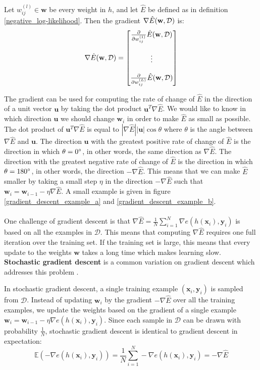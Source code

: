 \begin{definition}[gradient]
	\label{gradient}
	Let $w^{(l)}_{ij} \in \mathbf{w}$ be every weight in $h$, and let $\hat{E}$ be defined as in definition \ref{negative_log-likelihood}. Then the gradient $\nabla \hat{E}(\mathbf{w}, \mathcal{D})$ is:
	$$
	\nabla \hat{E}(\mathbf{w}, \mathcal{D}) = \begin{bmatrix} \frac{\partial}{\partial w^{(1)}_{ij}}\hat{E}(\mathbf{w}, \mathcal{D}) \\ \\ \vdots \\ \\ \frac{\partial}{\partial w^{(L)}_{ij}}\hat{E}(\mathbf{w}, \mathcal{D})\end{bmatrix}
	$$
\end{definition}
\noindent
The gradient can be used for computing the rate of change of $\hat{E}$ in the direction of a unit vector $\mathbf{u}$ by taking the dot product $\mathbf{u}^T\nabla \hat{E}$. We would like to know in which direction $\mathbf{u}$ we should change $\mathbf{w}_i$ in order to make $\hat{E}$ as small as possible. The dot product of $\mathbf{u}^T\nabla \hat{E}$ is equal to $|\nabla \hat{E}||\mathbf{u}|\cos \theta$ where $\theta$ is the angle between $\nabla \hat{E}$ and $\mathbf{u}$. The direction $\mathbf{u}$ with the greatest positive rate of change of $\hat{E}$ is the direction in which $\theta = 0\degree$, in other words, the same direction as $\nabla \hat{E}$. The direction with the greatest negative rate of change of $\hat{E}$ is the direction in which $\theta = 180\degree$, in other words, the direction $-\nabla \hat{E}$. This means that we can make $\hat{E}$ smaller by taking a small step $\eta$ in the direction $-\nabla \hat{E}$ such that $\mathbf{w}_i = \mathbf{w}_{i-1} - \eta\nabla\hat{E}$. A small example is given in figure \ref{gradient_descent_example_a} and \ref{gradient_descent_example_b}.
\\\\
One challenge of gradient descent is that $\nabla \hat{E} = \frac{1}{N}\sum_{i=1}^N\nabla e(h(\mathbf{x}_i), \mathbf{y}_i)$ is based on all the examples in $\mathcal{D}$. This means that computing $\nabla \hat{E}$ requires one full iteration over the training set. If the training set is large, this means that every update to the weights $\mathbf{w}$ takes a long time which makes learning slow. \textbf{Stochastic gradient descent} is a common variation on gradient descent which addresses this problem \citep{yaser12}. 

In stochastic gradient descent, a single training example $(\mathbf{x}_i, \mathbf{y}_i)$ is sampled from $\mathcal{D}$. Instead of updating $\mathbf{w}_i$ by the gradient $-\nabla \hat{E}$ over all the training examples, we update the weights based on the gradient of a single example $\mathbf{w}_i = \mathbf{w}_{i-1}-\eta\nabla e(h(\mathbf{x}_i), \mathbf{y}_i)$. Since each sample in $\mathcal{D}$ can be drawn with probability $\frac{1}{N}$, stochastic gradient descent is identical to gradient descent in expectation:
$$
\mathbb{E}(-\nabla e(h(\mathbf{x}_i), \mathbf{y}_i)) = \frac{1}{N}\sum\limits_{i=1}^N -\nabla e(h(\mathbf{x}_i), \mathbf{y}_i) = -\nabla\hat{E}
$$

